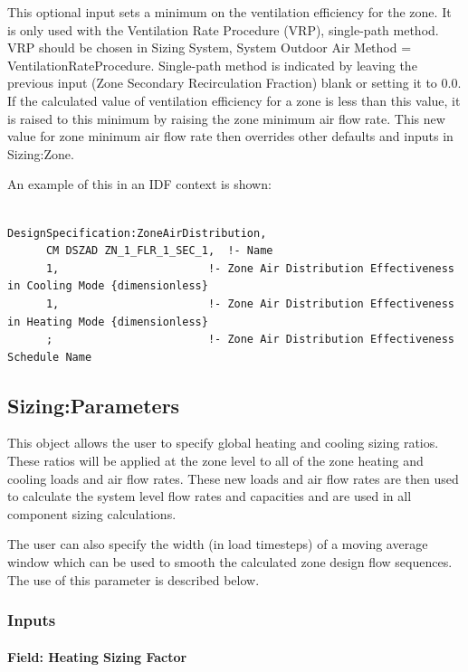 This optional input sets a minimum on the ventilation efficiency for the zone. It is only used with the Ventilation Rate Procedure (VRP), single-path method. VRP should be chosen in Sizing System, System Outdoor Air Method = VentilationRateProcedure. Single-path method is indicated by leaving the previous input (Zone Secondary Recirculation Fraction) blank or setting it to 0.0. If the calculated value of ventilation efficiency for a zone is less than this value, it is raised to this minimum by raising the zone minimum air flow rate. This new value for zone minimum air flow rate then overrides other defaults and inputs in Sizing:Zone.

An example of this in an IDF context is shown:

\begin{lstlisting}

DesignSpecification:ZoneAirDistribution,
      CM DSZAD ZN_1_FLR_1_SEC_1,  !- Name
      1,                       !- Zone Air Distribution Effectiveness in Cooling Mode {dimensionless}
      1,                       !- Zone Air Distribution Effectiveness in Heating Mode {dimensionless}
      ;                        !- Zone Air Distribution Effectiveness Schedule Name
\end{lstlisting}

\subsection{Sizing:Parameters}\label{sizingparameters}

This object allows the user to specify global heating and cooling sizing ratios. These ratios will be applied at the zone level to all of the zone heating and cooling loads and air flow rates. These new loads and air flow rates are then used to calculate the system level flow rates and capacities and are used in all component sizing calculations.

The user can also specify the width (in load timesteps) of a moving average window which can be used to smooth the calculated zone design flow sequences. The use of this parameter is described below.

\subsubsection{Inputs}\label{inputs-2-010}

\paragraph{Field: Heating Sizing Factor}\label{field-heating-sizing-factor}

